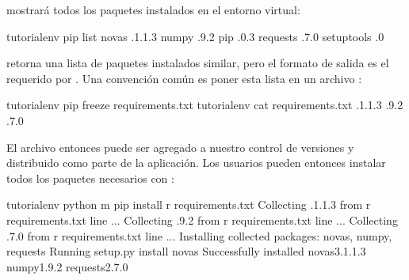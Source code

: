 \documentclass[a5paper,10pt,spanish]{sphinxmanual}
\begin{document}
\sphinxAtStartPar
{} mostrará todos los paquetes instalados en el entorno virtual:

\begin{sphinxVerbatim}[commandchars=\\\{\}]
tutorial\PYGZhy{}env \PYGZdl{} pip list
novas .1.1.3
numpy .9.2
pip .0.3
requests .7.0
setuptools .0
\end{sphinxVerbatim}

\sphinxAtStartPar
{} retorna una lista de paquetes instalados similar, pero el formato de salida es el requerido por .  Una convención común es poner esta lista en un archivo :

\begin{sphinxVerbatim}[commandchars=\\\{\}]
tutorial\PYGZhy{}env \PYGZdl{} pip freeze \PYGZgt{} requirements.txt
tutorial\PYGZhy{}env \PYGZdl{} cat requirements.txt
.1.1.3
.9.2
.7.0
\end{sphinxVerbatim}

\sphinxAtStartPar
El archivo  entonces puede ser agregado a nuestro control de versiones y distribuido como parte de la aplicación. Los usuarios pueden entonces instalar todos los paquetes necesarios con :

\begin{sphinxVerbatim}[commandchars=\\\{\}]
tutorial\PYGZhy{}env \PYGZdl{} python \PYGZhy{}m pip install \PYGZhy{}r requirements.txt
Collecting .1.1.3 from \PYGZhy{}r requirements.txt line 
  ...
Collecting .9.2 from \PYGZhy{}r requirements.txt line 
  ...
Collecting .7.0 from \PYGZhy{}r requirements.txt line 
  ...
Installing collected packages: novas, numpy, requests
  Running setup.py install  novas
Successfully installed novas\PYGZhy{}3.1.1.3 numpy\PYGZhy{}1.9.2 requests\PYGZhy{}2.7.0
\end{sphinxVerbatim}
\end{document}
